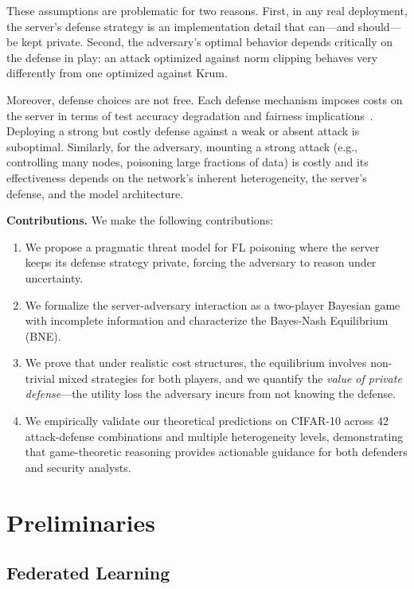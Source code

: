 \documentclass{article}
\begin{document}
These assumptions are problematic for two reasons. First, in any real deployment, the server's defense strategy is an implementation detail that can---and should---be kept private. Second, the adversary's optimal behavior depends critically on the defense in play: an attack optimized against norm clipping behaves very differently from one optimized against Krum.

Moreover, defense choices are not free. Each defense mechanism imposes costs on the server in terms of test accuracy degradation and fairness implications~\citep{wang2020attack}. Deploying a strong but costly defense against a weak or absent attack is suboptimal. Similarly, for the adversary, mounting a strong attack (e.g., controlling many nodes, poisoning large fractions of data) is costly and its effectiveness depends on the network's inherent heterogeneity, the server's defense, and the model architecture.

\textbf{Contributions.} We make the following contributions:
\begin{enumerate}
    \item We propose a pragmatic threat model for FL poisoning where the server keeps its defense strategy private, forcing the adversary to reason under uncertainty.
    \item We formalize the server-adversary interaction as a two-player Bayesian game with incomplete information and characterize the Bayes-Nash Equilibrium (BNE).
    \item We prove that under realistic cost structures, the equilibrium involves non-trivial mixed strategies for both players, and we quantify the \emph{value of private defense}---the utility loss the adversary incurs from not knowing the defense.
    \item We empirically validate our theoretical predictions on CIFAR-10 across 42 attack-defense combinations and multiple heterogeneity levels, demonstrating that game-theoretic reasoning provides actionable guidance for both defenders and security analysts.
\end{enumerate}

\section{Preliminaries}
\label{sec:prelim}

\subsection{Federated Learning}
\end{document}
